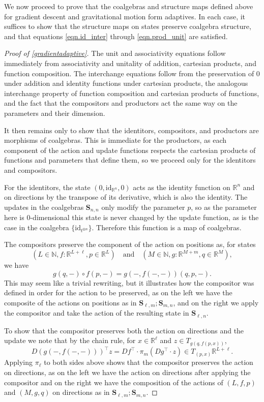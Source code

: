 \documentclass[11pt, one side, article]{memoir}
\theoremstyle{definition}
\theoremstyle{plain}
\newcommand{\Cat}[1]{\mathbf{#1}}%
\newcommand{\id}{\mathrm{id}}
\newcommand{\nn}{\mathbb{N}}
\newcommand{\rr}{\mathbb{R}}
\newcommand{\0}{\textsf{0}}
\newcommand{\1}{\tn{\textsf{1}}}
\renewcommand{\S}{{\Cat{S}}}
\newcommand{\idcoalg}[1]{{\{\id_{#1}\}}}
\begin{document}
We now proceed to prove that the coalgebras and structure maps defined above for gradient descent and gravitational motion form adaptives. In each case, it suffices to show that the structure maps on states preserve coalgebra structure, and that equations \eqref{eqn.id_inter} through \eqref{eqn.prod_unit} are satisfied.

\begin{proof}[Proof of \cref{gradientadaptive}]
The unit and associativity equations follow immediately from associativity and unitality of addition, cartesian products, and function composition. The interchange equations follow from the preservation of 0 under addition and identity functions under cartesian products, the analogous interchange property of function composition and cartesian products of functions, and the fact that the compositors and productors act the same way on the parameters and their dimension. 

It then remains only to show that the identitors, compositors, and productors are morphisms of coalgebras. This is immediate for the productors, as each component of the action and update functions respects the cartesian products of functions and parameters that define them, so we proceed only for the identitors and compositors.

For the identitors, the state $(0,\id_{\rr^n},0)$ acts as the identity function on $\rr^n$ and on directions by the transpose of its derivative, which is also the identity. The updates in the coalgebras $\S_{n,n}$ only modify the parameter $p$, so as the parameter here is 0-dimensional this state is never changed by the update function, as is the case in the coalgebra $\idcoalg{t^{\otimes n}}$. Therefore this function is a map of coalgebras.

The compositors preserve the component of the action on positions as, for states 
\[(L \in \nn, f\colon \rr^{L+\ell}, p \in \rr^L) \quad \textrm{and} \quad (M \in \nn, g\colon \rr^{M+m}, q \in \rr^M),\]
we have 
\[g(q,-) \circ f(p,-) = g(-,f(-,-))(q,p,-).\]
This may seem like a trivial rewriting, but it illustrates how the compositor was defined in order for the action to be preserved, as on the left we have the composite of the actions on positions as in $\S_{\ell,m};\S_{m,n}$, and on the right we apply the compositor and take the action of the resulting state in $\S_{\ell,n}$.

To show that the compositor preserves both the action on directions and the update we note that by the chain rule, for $x \in \rr^\ell$ and $z \in T_{g(q,f(p,x))}$,
\[D\left( g(-,f(-,-)) \right)^\top z = Df^\top \cdot \pi_m(Dg^\top \cdot z) \in T_{(p,x)}\rr^{L+\ell}.\]
Applying $\pi_\ell$ to both sides above shows that the compositor preserves the action on directions, as on the left we have the action on directions after applying the compositor and on the right we have the composition of the actions of $(L,f,p)$ and $(M,g,q)$ on directions as in $\S_{\ell,m};\S_{m,n}$.


\end{proof}
\end{document}
